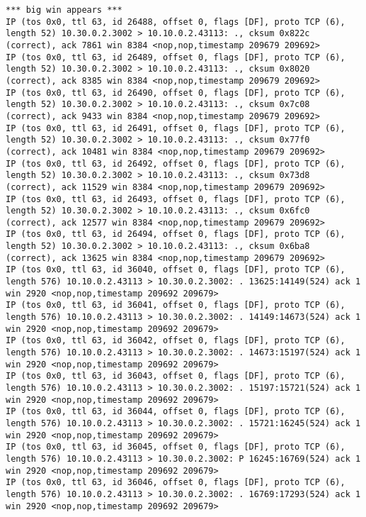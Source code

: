 \documentclass[a4paper,12pt]{article}
\begin{document}
\begin{lstlisting}
*** big win appears ***
IP (tos 0x0, ttl 63, id 26488, offset 0, flags [DF], proto TCP (6), length 52) 10.30.0.2.3002 > 10.10.0.2.43113: ., cksum 0x822c (correct), ack 7861 win 8384 <nop,nop,timestamp 209679 209692>
IP (tos 0x0, ttl 63, id 26489, offset 0, flags [DF], proto TCP (6), length 52) 10.30.0.2.3002 > 10.10.0.2.43113: ., cksum 0x8020 (correct), ack 8385 win 8384 <nop,nop,timestamp 209679 209692>
IP (tos 0x0, ttl 63, id 26490, offset 0, flags [DF], proto TCP (6), length 52) 10.30.0.2.3002 > 10.10.0.2.43113: ., cksum 0x7c08 (correct), ack 9433 win 8384 <nop,nop,timestamp 209679 209692>
IP (tos 0x0, ttl 63, id 26491, offset 0, flags [DF], proto TCP (6), length 52) 10.30.0.2.3002 > 10.10.0.2.43113: ., cksum 0x77f0 (correct), ack 10481 win 8384 <nop,nop,timestamp 209679 209692>
IP (tos 0x0, ttl 63, id 26492, offset 0, flags [DF], proto TCP (6), length 52) 10.30.0.2.3002 > 10.10.0.2.43113: ., cksum 0x73d8 (correct), ack 11529 win 8384 <nop,nop,timestamp 209679 209692>
IP (tos 0x0, ttl 63, id 26493, offset 0, flags [DF], proto TCP (6), length 52) 10.30.0.2.3002 > 10.10.0.2.43113: ., cksum 0x6fc0 (correct), ack 12577 win 8384 <nop,nop,timestamp 209679 209692>
IP (tos 0x0, ttl 63, id 26494, offset 0, flags [DF], proto TCP (6), length 52) 10.30.0.2.3002 > 10.10.0.2.43113: ., cksum 0x6ba8 (correct), ack 13625 win 8384 <nop,nop,timestamp 209679 209692>
IP (tos 0x0, ttl 63, id 36040, offset 0, flags [DF], proto TCP (6), length 576) 10.10.0.2.43113 > 10.30.0.2.3002: . 13625:14149(524) ack 1 win 2920 <nop,nop,timestamp 209692 209679>
IP (tos 0x0, ttl 63, id 36041, offset 0, flags [DF], proto TCP (6), length 576) 10.10.0.2.43113 > 10.30.0.2.3002: . 14149:14673(524) ack 1 win 2920 <nop,nop,timestamp 209692 209679>
IP (tos 0x0, ttl 63, id 36042, offset 0, flags [DF], proto TCP (6), length 576) 10.10.0.2.43113 > 10.30.0.2.3002: . 14673:15197(524) ack 1 win 2920 <nop,nop,timestamp 209692 209679>
IP (tos 0x0, ttl 63, id 36043, offset 0, flags [DF], proto TCP (6), length 576) 10.10.0.2.43113 > 10.30.0.2.3002: . 15197:15721(524) ack 1 win 2920 <nop,nop,timestamp 209692 209679>
IP (tos 0x0, ttl 63, id 36044, offset 0, flags [DF], proto TCP (6), length 576) 10.10.0.2.43113 > 10.30.0.2.3002: . 15721:16245(524) ack 1 win 2920 <nop,nop,timestamp 209692 209679>
IP (tos 0x0, ttl 63, id 36045, offset 0, flags [DF], proto TCP (6), length 576) 10.10.0.2.43113 > 10.30.0.2.3002: P 16245:16769(524) ack 1 win 2920 <nop,nop,timestamp 209692 209679>
IP (tos 0x0, ttl 63, id 36046, offset 0, flags [DF], proto TCP (6), length 576) 10.10.0.2.43113 > 10.30.0.2.3002: . 16769:17293(524) ack 1 win 2920 <nop,nop,timestamp 209692 209679>

\end{lstlisting}
\end{document}
